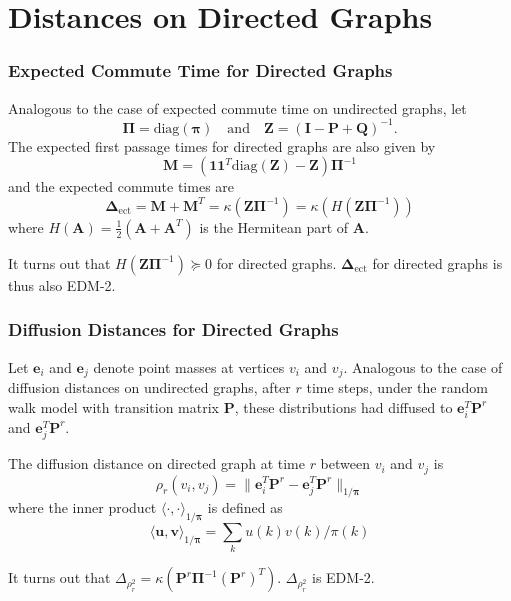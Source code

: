 \documentclass[professionalfonts, hyperref={pdfpagelabels=false,
  colorlinks=true, linkcolor=purple}]{beamer}
\begin{document}
\section{Distances on Directed Graphs}
\begin{frame}
  \frametitle{Expected Commute Time for Directed Graphs}
  Analogous to the case of expected commute time on undirected graphs,
  let 
  \begin{equation*}
    \bm{\Pi} = \mathrm{diag}(\bm{\pi}) \quad \text{and} \quad
    \mathbf{Z} = (\mathbf{I} - \mathbf{P} + \mathbf{Q})^{-1}.
  \end{equation*}
  The expected first passage times for directed graphs are also given by
  \begin{equation*}
    \mathbf{M} = (\mathbf{1}\mathbf{1}^{T}\mathrm{diag}(\mathbf{Z}) -
    \mathbf{Z})\bm{\Pi}^{-1} 
  \end{equation*}
  and the expected commute times are
  \begin{equation*}
    \bm{\Delta}_{\mathrm{ect}} = \mathbf{M} + \mathbf{M}^{T} =
    \kappa(\mathbf{Z}\bm{\Pi}^{-1}) =
    \kappa(H(\mathbf{Z}\bm{\Pi}^{-1}))
  \end{equation*}
  where $H(\mathbf{A}) = \tfrac{1}{2}(\mathbf{A} + \mathbf{A}^{T})$ is
  the Hermitean part of $\mathbf{A}$.
\begin{alertblock}{}
  It turns out that $H(\mathbf{Z}\bm{\Pi}^{-1}) \succeq 0$ for
  directed graphs. $\bm{\Delta}_{\mathrm{ect}}$ for directed graphs is
  thus also EDM-2.
\end{alertblock}
\end{frame}

\begin{frame}
  \frametitle{Diffusion Distances for Directed Graphs}
  Let $\bm{e}_i$ and $\bm{e}_j$ denote point masses at vertices $v_i$ and
  $v_j$. Analogous to the case of diffusion distances on undirected
  graphs, after $r$ time steps, under the random walk model with
  transition matrix $\mathbf{P}$, these distributions had diffused to
  $\bm{e}_i^{T} \mathbf{P}^{r}$ and $\bm{e}_j^{T}\mathbf{P}^{r}$. 
  
  \vskip10pt 

  The diffusion distance on directed graph at
  time $r$ between $v_i$ and $v_j$ is
  \begin{equation*}
    \rho_{r}(v_i,v_j) = \| \bm{e}_i^{T} \mathbf{P}^{r} -
    \bm{e}_j^{T}
    \mathbf{P}^{r} \|_{1/\bm{\pi}}
  \end{equation*}
  where the inner product $\langle \cdot, \cdot
  \rangle_{1/\bm{\pi}}$ is defined as
  \begin{equation*}
    \langle \bm{u}, \bm{v} \rangle_{1/\bm{\pi}} = \sum_{k} u(k)
    v(k)/\pi(k)
  \end{equation*}
    
  \begin{alertblock}{}
    It turns out that $\Delta_{\rho_{r}^{2}} =
    \kappa(\mathbf{P}^{r}\bm{\Pi}^{-1}(\mathbf{P}^{r})^{T})$.
    $\Delta_{\rho_{r}^{2}}$ is EDM-2.
  \end{alertblock}{}
    
\end{frame}
\end{document}
